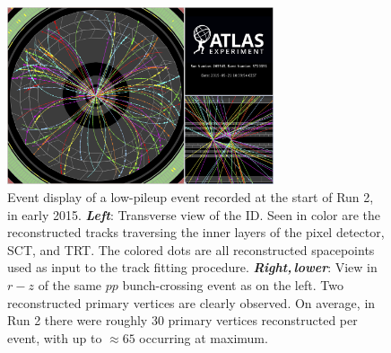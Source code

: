 \begin{figure}[!htb]
    \begin{center}
        \includegraphics[width=0.7\textwidth]{figures/chapter3/event_display_tracking_vertexing}
        \caption{
            Event display of a low-pileup event recorded at the start of Run 2, in early 2015.
            \textbf{\textit{Left}}: Transverse view of the ID. Seen in color are the reconstructed tracks traversing
                the inner layers of the pixel detector, SCT, and TRT. The colored dots are all reconstructed
                spacepoints used as input to the track fitting procedure.
            \textbf{\textit{Right,\,lower}}: View in $r-z$ of the same $pp$ bunch-crossing event as on the left.
                Two reconstructed primary vertices are clearly observed.
                On average, in Run 2 there were roughly 30 primary vertices reconstructed per event, with
                up to $\approx65$ occurring at maximum.
        }
        \label{fig:id_event_display}
    \end{center}
\end{figure}
\FloatBarrier
